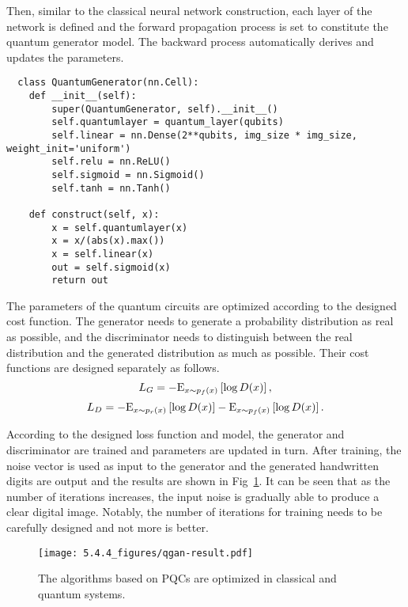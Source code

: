 Then, similar to the classical neural network construction, each layer of the network is defined and the forward propagation process is set to constitute the quantum generator model. The backward process automatically derives and updates the parameters.
\begin{lstlisting}
  class QuantumGenerator(nn.Cell):
    def __init__(self):
        super(QuantumGenerator, self).__init__()
        self.quantumlayer = quantum_layer(qubits)
        self.linear = nn.Dense(2**qubits, img_size * img_size, weight_init='uniform')
        self.relu = nn.ReLU()
        self.sigmoid = nn.Sigmoid()
        self.tanh = nn.Tanh()

    def construct(self, x):
        x = self.quantumlayer(x)
        x = x/(abs(x).max())
        x = self.linear(x)
        out = self.sigmoid(x)
        return out
\end{lstlisting}

The parameters of the quantum circuits are optimized according to the designed cost function. The generator needs to generate a probability distribution as real as possible, and the discriminator needs to distinguish between the real distribution and the generated distribution as much as possible. Their cost functions are designed separately as follows.
\begin{equation}
  {L_G} =  - {{\rm E}_{x\sim{p_f}(x)}}\left[ {\log D(x)} \right],
\end{equation}
\begin{equation}
  {L_D} =  - {{\rm E}_{x\sim{p_r}(x)}}\left[ {\log D(x)} \right] - {{\rm E}_{x\sim{p_f}(x)}}\left[ {\log D(x)} \right].
\end{equation}

According to the designed loss function and model, the generator and discriminator are trained and parameters are updated in turn. After training, the noise vector is used as input to the generator and the generated handwritten digits are output and the results are shown in Fig~\ref{qgan-result}. It can be seen that as the number of iterations increases, the input noise is gradually able to produce a clear digital image. Notably, the number of iterations for training needs to be carefully designed and not more is better.
\begin{figure}[htbp]
  \centering
  \texttt{[image: 5.4.4\_figures/qgan-result.pdf]}
  \caption{\label{qgan-result} The algorithms based on PQCs are optimized in classical and quantum systems.}
\end{figure}